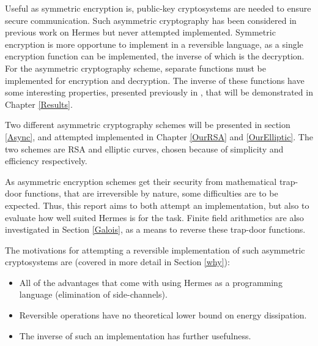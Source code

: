 Useful as symmetric encryption is, public-key cryptosystems are needed to ensure secure communication. Such asymmetric cryptography has been considered in previous work on Hermes but never attempted implemented. Symmetric encryption is more opportune to implement in a reversible language, as a single encryption function can be implemented, the inverse of which is the decryption. For the asymmetric cryptography scheme, separate functions must be implemented for encryption and decryption. The inverse of these functions have some interesting properties, presented previously in \cite{EaRC}, that will be demonstrated in Chapter \ref{Results}. 

Two different asymmetric cryptography schemes will be presented in section \ref{Async}, and attempted implemented in Chapter \ref{OurRSA} and \ref{OurElliptic}. The two schemes are RSA and elliptic curves, chosen because of simplicity and efficiency respectively.

As asymmetric encryption schemes get their security from mathematical trap-door functions, that are irreversible by nature, some difficulties are to be expected. Thus, this report aims to both attempt an implementation, but also to evaluate how well suited Hermes is for the task. Finite field arithmetics are also investigated in Section \ref{Galois}, as a means to reverse these trap-door functions.


The motivations for attempting a reversible implementation of such asymmetric cryptosystems are (covered in more detail in Section \ref{why}):
\begin{itemize}
\item All of the advantages that come with using Hermes as a programming language (elimination of side-channels).
\item Reversible operations have no theoretical lower bound on energy dissipation.
\item The inverse of such an implementation has further usefulness.
\end{itemize}


